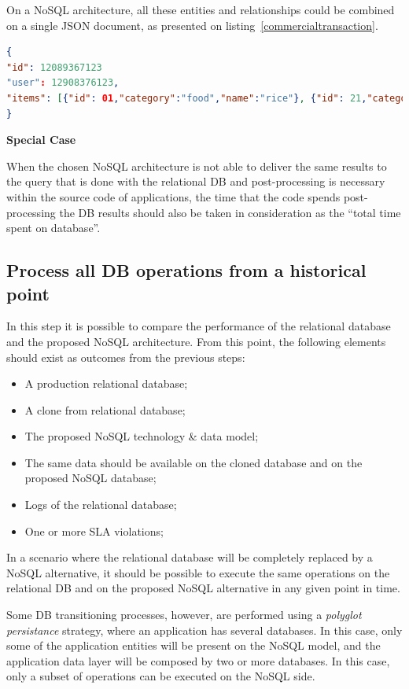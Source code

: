 On a NoSQL architecture, all these entities and relationships could be combined on a single JSON document, as presented on listing~\ref{commercialtransaction}. 

\begin{lstlisting}[language=json,firstnumber=1, caption=BI application commercial transaction represented as a single document., label=commercialtransaction]
{
"id": 12089367123
"user": 12908376123,
"items": [{"id": 01,"category":"food","name":"rice"}, {"id": 21,"category":"drinks","name":"soda"}]
}
\end{lstlisting}

\noindent \textbf{Special Case}

When the chosen NoSQL architecture is not able to deliver the same results to the query that is done with the relational DB and post-processing is necessary within the source code of applications, the time that the code spends post-processing the DB results should also be taken in consideration as the ``total time spent on database''.


\subsection{Process all DB operations from a historical point}

In this step it is possible to compare the performance of the relational database and the proposed NoSQL architecture. From this point, the following elements should exist as outcomes from the previous steps: 

\begin{itemize}
\item{A production relational database;}
\item{A clone from relational database;}
\item{The proposed NoSQL technology \& data model;}
\item{The same data should be available on the cloned database and on the proposed NoSQL database;}
\item{Logs of the relational database;}
\item{One or more SLA violations;}
\end{itemize}

In a scenario where the relational database will be completely replaced by a NoSQL alternative, it should be possible to execute the same operations on the relational DB and on the proposed NoSQL alternative in any given point in time.

Some DB transitioning processes, however, are performed using a \textit{polyglot persistance} strategy, where an application has several databases. In this case, only some of the application entities will be present on the NoSQL model, and the application data layer will be composed by two or more databases. In this case, only a subset of operations can be executed on the NoSQL side.

